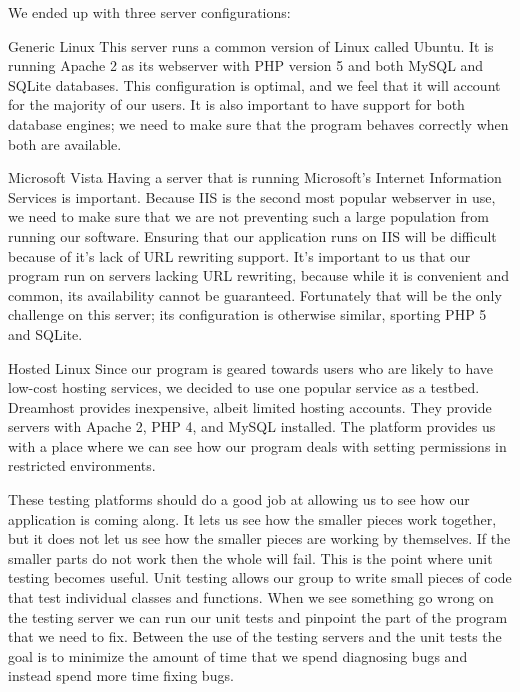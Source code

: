 \documentclass[a4paper,12pt]{report}
\begin{document}
We ended up with three server configurations:
\begin{description}
	\item{Generic Linux} This server runs a common version of Linux called Ubuntu. It is running Apache 2 as its webserver with PHP version 5 and both MySQL and SQLite databases. This configuration is optimal, and we feel that it will account for the majority of our users. It is also important to have support for both database engines; we need to make sure that the program behaves correctly when both are available.
	\item{Microsoft Vista} Having a server that is running Microsoft's Internet Information Services is important. 
Because IIS is the second most popular webserver in use, we need to make sure that we are not preventing such a large population from running our software. Ensuring that our application runs on IIS will be difficult because of it's lack of URL rewriting support. It's important to us that our program run on servers lacking URL rewriting, because while it is convenient and common, its availability cannot be guaranteed. Fortunately that will be the only challenge on this server; its configuration is otherwise similar, sporting PHP 5 and SQLite.
	\item{Hosted Linux} Since our program is geared towards users who are likely to have low-cost hosting services, we decided to use one popular service as a testbed. Dreamhost provides inexpensive, albeit limited hosting accounts. They provide servers with Apache 2, PHP 4, and MySQL installed. The platform provides us with a place where we can see how our program deals with setting permissions in restricted environments.
\end{description}

These testing platforms should do a good job at allowing us to see how our application is coming along.
It lets us see how the smaller pieces work together, but it does not let us see how the smaller pieces are working by themselves.
If the smaller parts do not work then the whole will fail.
This is the point where unit testing becomes useful.
Unit testing allows our group to write small pieces of code that test individual classes and functions.
When we see something go wrong on the testing server we can run our unit tests and pinpoint the part of the program that we need to fix.
Between the use of the testing servers and the unit tests the goal is to minimize the amount of time that we spend diagnosing bugs and instead spend more time fixing bugs.
\end{document}
